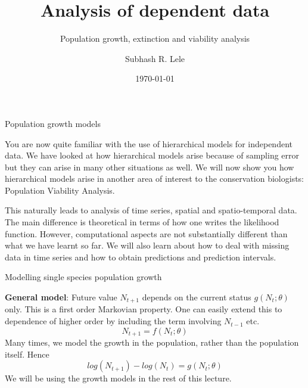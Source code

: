 \documentclass[10pt]{beamer}
\title{Analysis of dependent data}
\subtitle {Population growth, extinction and viability analysis}
\author{Subhash R. Lele}
\institute {University of Alberta}
\institute{Department of Mathematical Sciences\\University of Alberta\\Canada\\\textit{Email: slele@ualberta.ca}}
\date{\today}
\begin{document}
\frame{\titlepage}


\begin{frame}
\begin{center}
\LARGE{Population growth models}
\end{center}

You are now quite familiar with the use of hierarchical models for independent data. We have looked at how hierarchical models arise because of sampling error but they can arise in many other situations as well. We will now show you how hierarchical models arise in another area of interest to the conservation biologists: Population Viability Analysis. 

\end{frame}

\begin{frame}
This naturally leads to analysis of time series, spatial and spatio-temporal data. The main difference is theoretical in terms of how one writes the likelihood function. However, computational aspects are not substantially different than what we have learnt so far. We will also learn about how to deal with \alert {missing data in time series} and how to obtain \alert {predictions and prediction intervals.} 
\end{frame}

\begin{frame}
\begin{center}
\LARGE {Modelling single species population growth}
\end{center}

\textbf {General model}: Future value $N_{t+1}$ depends on the current status $g(N_{t};\theta)$ only. This is a first order Markovian property. One can easily extend this to dependence of higher order by including the term involving $N_{t-1}$ etc.
\begin{equation}
N_{t+1}=f(N_{t};\theta)
\end{equation}
Many times, we model the growth in the population, rather than the population itself. Hence\\
\begin{equation}
log(N_{t+1})-log(N_{t})=g(N_{t};\theta)
\end{equation}
We will be using the growth models in the rest of this lecture. 
\end{frame}
\end{document}
